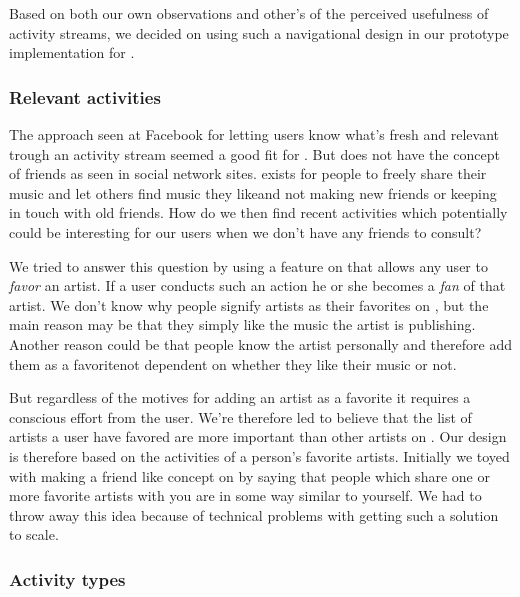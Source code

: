 
Based on both our own observations and other's of the perceived usefulness
of activity streams, we decided on using such a navigational design in
our prototype implementation for \urort{}.

\subsubsection{Relevant activities}

The approach seen at Facebook for letting users know what's fresh and relevant
trough an activity stream seemed a good fit for \urort{}. But
\urort{} does not have the concept of friends as seen in social network sites.
\urort{} exists for people to freely share their music and let others find
music they like\dash{}and not making new friends or keeping in touch with
old friends. How do we then find recent activities which potentially could be
interesting for our users when we don't have any friends to consult?

We tried to answer this question by using a feature on \urort{} that allows
any user to \emph{favor} an artist. If a user conducts such an action he or
she becomes a \emph{fan} of that artist. We don't know why people signify
artists as their favorites on \urort{}, but the main reason may be that
they simply like the music the artist is publishing.
Another reason could be that people know the artist personally and therefore
add them as a favorite\dash{}not dependent on whether they like their music or
not.

But regardless of the motives for adding an artist as a favorite it requires
a conscious effort from the user. We're therefore led to believe that the list
of artists a user have favored are more important than other artists on
\urort{}. Our design is therefore based on the activities of a person's
favorite artists. Initially we toyed with making a friend like concept on
\urort{} by saying that people which share one or more favorite artists with
you are in some way similar to yourself. We had to throw away this idea
because of technical problems with getting such a solution to scale.

\subsubsection{Activity types}

